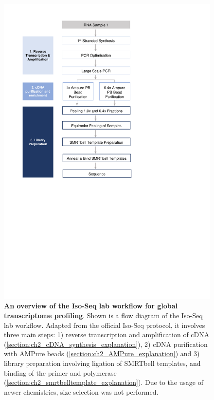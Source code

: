 \begin{figure}[htp]
	\includegraphics[page=1,trim={0 12cm 5cm 1cm},clip,scale = 1]{Figures/ProjectDevelopment_Figures.pdf}
	\captionsetup{width=0.95\textwidth}
	\caption[Iso-Seq Lab workflow for global transcriptome profiling]%
	{\textbf{An overview of the Iso-Seq lab workflow for global transcriptome profiling}. Shown is a flow diagram of the Iso-Seq lab workflow. Adapted from the official Iso-Seq protocol, it involves three main steps: 1) reverse transcription and amplification of cDNA (\cref{section:ch2_cDNA_synthesis_explanation}), 2) cDNA purification with AMPure beads (\cref{section:ch2_AMPure_explanation}) and 3) library preparation involving ligation of SMRTbell templates, and binding of the primer and polymerase (\cref{section:ch2_smrtbelltemplate_explanation}). Due to the usage of newer chemistries, size selection was not performed.}
	\label{fig:isoseq_wholelab_protocol}
\end{figure}


